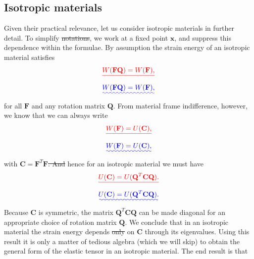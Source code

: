 \documentclass [a4paper,12pt]{paper}
\providecommand{\DIFadd}[1]{{\protect\color{blue}\uwave{#1}}} %
\providecommand{\DIFdel}[1]{{\protect\color{red}\sout{#1}}}                      %
\providecommand{\DIFaddbegin}{} %
\providecommand{\DIFaddend}{} %
\providecommand{\DIFdelbegin}{} %
\providecommand{\DIFdelend}{} %
\begin{document}
\subsection*{Isotropic materials}

Given their practical relevance, let us consider isotropic materials in further detail. To simplify \DIFdelbegin \DIFdel{notations}\DIFdelend \DIFaddbegin \DIFadd{notation}\DIFaddend , 
we work at a fixed point $\mathbf{x}$, and suppress this dependence within the formulae. By assumption the strain energy of an 
isotropic material satisfies
\DIFdelbegin \begin{displaymath}
\DIFdel{W(\mathbf{F}\mathbf{Q}) = W(\mathbf{F}),
}\end{displaymath}%
\DIFdelend \DIFaddbegin \begin{equation}
\DIFadd{W(\mathbf{F}\mathbf{Q}) = W(\mathbf{F}),
\label{eq:39}
}\end{equation}\DIFaddend 
for all $\mathbf{F}$ and any rotation matrix $\mathbf{Q}$. From material frame indifference, however, we know that we can always write
\DIFdelbegin \begin{displaymath}
\DIFdel{W(\mathbf{F}) = U(\mathbf{C}),
}\end{displaymath}%
\DIFdelend \DIFaddbegin \begin{equation}
\DIFadd{W(\mathbf{F}) = U(\mathbf{C}),
\label{eq:40}
}\end{equation}\DIFaddend 
with $\mathbf{C} = \mathbf{F}^{T}\mathbf{F}$\DIFdelbegin \DIFdel{. And }\DIFdelend \DIFaddbegin \DIFadd{, and }\DIFaddend hence for an isotropic material we must have
\DIFdelbegin \begin{displaymath}
\DIFdel{U(\mathbf{C}) = U(\mathbf{Q}^{T}\mathbf{C}\mathbf{Q}).
}\end{displaymath}%
\DIFdelend \DIFaddbegin \begin{equation}
\DIFadd{U(\mathbf{C}) = U(\mathbf{Q}^{T}\mathbf{C}\mathbf{Q}).
\label{eq:41}
}\end{equation}\DIFaddend 
Because $\mathbf{C}$ is symmetric, the matrix $\mathbf{Q}^{T}\mathbf{C}\mathbf{Q}$ can be made diagonal for
 an appropriate choice of rotation matrix $\mathbf{Q}$. We conclude that in an isotropic material the strain 
 energy depends \DIFdelbegin \DIFdel{only }\DIFdelend on $\mathbf{C}$ \DIFaddbegin \DIFadd{only }\DIFaddend through its eigenvalues. Using this result it is only a matter of tedious algebra 
 (which we will skip) to obtain the general form of the elastic tensor in an isotropic material. The end result is that
\end{document}
